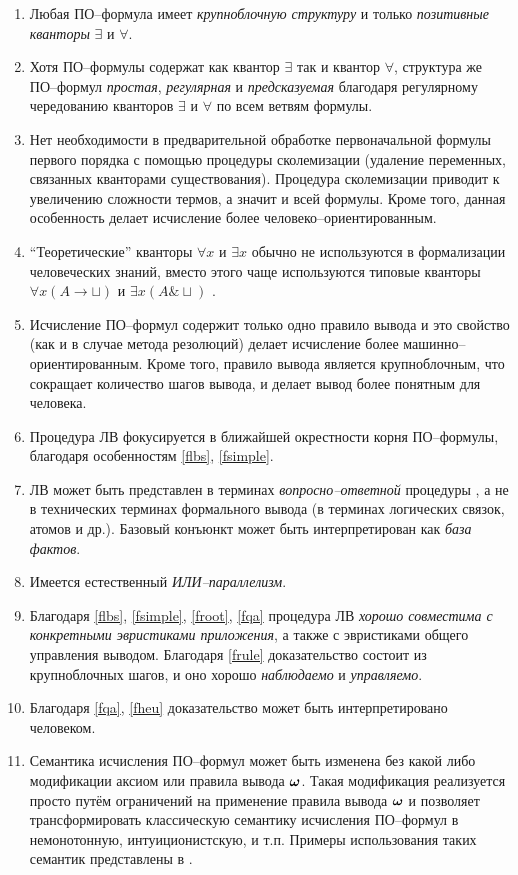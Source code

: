 \begin{enumerate}
\item\label{flbs} Любая ПО--формула имеет {\em крупноблочную структуру} и только {\em позитивные кванторы} $\exists$ и $\forall$.
%
\item\label{fsimple} Хотя ПО--формулы содержат как квантор $\exists$ так и квантор $\forall$, структура же ПО--формул {\em простая}, {\em регулярная} и {\em предсказуемая} благодаря регулярному чередованию кванторов $\exists$ и $\forall$ по всем ветвям формулы.
%
\item Нет необходимости в предварительной обработке первоначальной формулы первого порядка с помощью процедуры сколемизации (удаление переменных, связанных кванторами существования). Процедура сколемизации приводит к увеличению сложности термов, а значит и всей формулы. Кроме того, данная особенность делает исчисление более человеко--ориентированным.
%
\item ``Теоретические'' кванторы $\forall x$ и $\exists x$ обычно не используются в формализации человеческих знаний, вместо этого чаще используются типовые кванторы $\forall x(A \rightarrow \sqcup)$ и $\exists x(A \& \sqcup)$ \cite{Bourbaki, ICDS2000, NNN}.
%
\item\label{frule} Исчисление ПО--формул содержит только одно правило вывода и это свойство (как и в случае метода резолюций) делает исчисление более машинно--ориентированным. Кроме того, правило вывода является крупноблочным, что сокращает количество шагов вывода, и делает вывод более понятным для человека.
%
\item\label{froot} Процедура ЛВ фокусируется в ближайшей окрестности корня ПО--формулы, благодаря особенностям \ref{flbs}, \ref{fsimple}.
%
\item\label{fqa} ЛВ может быть представлен в терминах {\em вопросно--ответной} процедуры \cite{ICDS2000}, а не в технических терминах формального вывода (в терминах логических связок, атомов и др.). Базовый конъюнкт может быть интерпретирован как {\em база фактов}.
%
\item Имеется естественный {\em ИЛИ--параллелизм}.
%
\item\label{fheu} Благодаря \ref{flbs}, \ref{fsimple}, \ref{froot}, \ref{fqa} процедура ЛВ {\em хорошо совместима с конкретными эвристиками приложения}, а также с эвристиками общего управления выводом. Благодаря \ref{frule} доказательство состоит из крупноблочных шагов, и оно хорошо {\em наблюдаемо} и {\em управляемо}.
%
\item Благодаря \ref{fqa}, \ref{fheu} доказательство может быть интерпретировано человеком.
%
\item Семантика исчисления ПО--формул может быть изменена без какой либо модификации аксиом или правила вывода $\boldsymbol{\omega}$. Такая модификация реализуется просто путём ограничений на применение правила вывода $\boldsymbol{\omega}$ и позволяет трансформировать классическую семантику исчисления ПО--формул в немонотонную, интуиционистскую, и т.п. Примеры использования таких семантик представлены в \cite{ICDS2000}.
\end{enumerate} 


